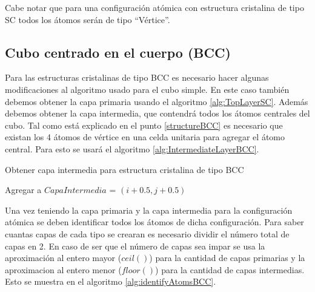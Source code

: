 Cabe notar que para una configuración atómica con estructura cristalina de tipo SC todos los átomos serán de tipo ``Vértice''.

\subsection{Cubo centrado en el cuerpo (BCC)}

\label{identifyAtomsBCC}

Para las estructuras cristalinas de tipo BCC es necesario hacer algunas modificaciones al algoritmo usado para el cubo simple. En este caso también debemos obtener la capa primaria usando el algoritmo \ref{alg:TopLayerSC}. Además debemos obtener la capa intermedia, que contendrá todos los átomos centrales del cubo. Tal como está explicado en el punto \ref{structureBCC} es necesario que existan los 4 átomos de vértice en una celda unitaria para agregar el átomo central. Para esto se usará el algoritmo \ref{alg:IntermediateLayerBCC}.

\begin{algorithm}[ht]
  \caption{Obtener capa intermedia para estructura cristalina de tipo BCC}
  \label{alg:IntermediateLayerBCC}
  \begin{algorithmic}[1]
          \STATE Agregar a $CapaIntermedia$ = $(i + 0.5, j + 0.5)$
        \ENDIF
      \ENDFOR
    \ENDFOR
  \end{algorithmic}
\end{algorithm}

Una vez teniendo la capa primaria y la capa intermedia para la configuración atómica se deben identificar todos los átomos de dicha configuración. Para saber cuantas capas de cada tipo se crearan es necesario dividir el número total de capas en 2. En caso de ser que el número de capas sea impar se usa la aproximación al entero mayor ($ceil()$) para la cantidad de capas primarias y la aproximacion al entero menor ($floor()$) para la cantidad de capas intermedias. Esto se muestra en el algoritmo \ref{alg:identifyAtomsBCC}.

